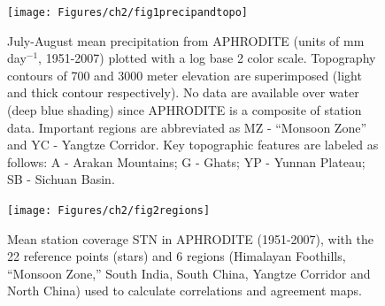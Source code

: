 \begin{figure}[t]
\centering
  \noindent\texttt{[image: Figures/ch2/fig1precipandtopo]}\\
  \caption{July-August mean precipitation from APHRODITE (units of mm day$^{-1}$, 1951-2007) plotted with a log base 2 color scale. Topography contours of 700 and 3000 meter elevation are superimposed (light and thick contour respectively). No data are available over water (deep blue shading) since APHRODITE is a composite of station data. Important regions are abbreviated as MZ - ``Monsoon Zone'' and YC - Yangtze Corridor. Key topographic features are labeled as follows: A - Arakan Mountains; G - Ghats; YP - Yunnan Plateau; SB - Sichuan Basin.}
\label{fig:f21}
\end{figure}

\begin{figure}[t]
\centering
  \noindent\texttt{[image: Figures/ch2/fig2regions]}\\
  \caption{Mean station coverage STN in APHRODITE (1951-2007), with the 22 reference points (stars) and 6 regions (Himalayan Foothills, ``Monsoon Zone,'' South India, South China, Yangtze Corridor and North China) used to calculate correlations and agreement maps.}
\label{fig:f22}
\end{figure}

